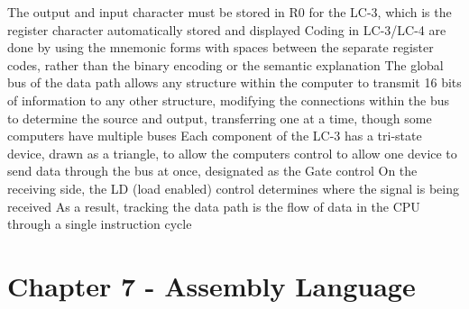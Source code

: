 \documentclass[11 pt, twoside]{article}
\newenvironment{outline*}
{
	\begin{outline}[enumerate]
	}
	{\end{outline}
}
\begin{document}
\begin{outline*}
\3 The output and input character must be stored in R0 for the LC-3, which is the register character automatically stored and displayed
\1 Coding in LC-3/LC-4 are done by using the mnemonic forms with spaces between the separate register codes, rather than the binary encoding or the semantic explanation
\1 The global bus of the data path allows any structure within the computer to transmit 16 bits of information to any other structure, modifying the connections within the bus to determine the source and output, transferring one at a time, though some computers have multiple buses
\2 Each component of the LC-3 has a tri-state device, drawn as a triangle, to allow the computers control to allow one device to send data through the bus at once, designated as the Gate control
\2 On the receiving side, the LD (load enabled) control determines where the signal is being received
\2 As a result, tracking the data path is the flow of data in the CPU through a single instruction cycle
\end{outline*}
\section{Chapter 7 - Assembly Language}
\end{document}
